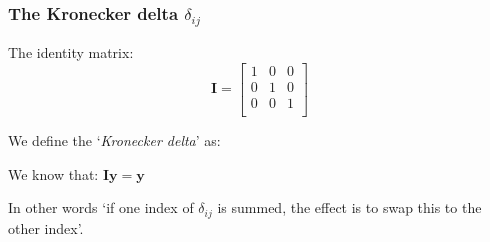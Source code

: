 \documentclass[notes]{beamer}
\begin{document}
\begin{frame}
\frametitle{The Kronecker delta $\delta_{ij}$}
The identity matrix:
\begin{equation*}
	\mathbf{I} = 
	\begin{bmatrix}
		1 & 0 & 0 \\
		0 & 1 & 0 \\
		0 & 0 & 1 \\
	\end{bmatrix}
\end{equation*}

We define the `\textit{Kronecker delta}' as:

We know that: $\mathbf{Iy} = \mathbf{y}$

In other words ‘if one index of $\delta_{ij}$ is summed, the effect is to swap this to the other
index’.
\end{frame}
\end{document}
